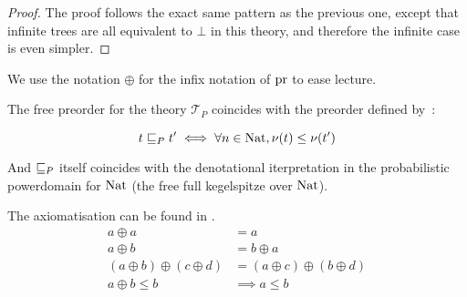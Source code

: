 \begin{proof}
    The proof follows the exact same pattern as the previous one,
    except that infinite trees are all equivalent to $\bot$ 
    in this theory, and therefore the infinite case is even 
    simpler.
\end{proof}


\begin{alemma}
    We use the notation $\oplus$ for the infix notation 
    of $\operatorname{pr}$ to ease lecture.

    The free preorder for the theory $\mathcal{T}_P$
    coincides with the preorder defined by~:
    
    \begin{equation*}
        t \sqsubseteq_P t' \iff 
        \forall n \in \textnormal{Nat}, \nu (t) \leq \nu (t')
    \end{equation*}

    And $\sqsubseteq_P$ itself coincides with the denotational
    iterpretation in the probabilistic powerdomain for $\textnormal{Nat}$
    (the free full kegelspitze over $\textnormal{Nat}$).

    The axiomatisation can be found in \cite{heckmann1994probabilistic}.
    \begin{equation*}
        \begin{array}{rl}
            a \oplus a &= a \\
            a \oplus b &= b \oplus a \\
            (a \oplus b) \oplus (c \oplus d) &= (a \oplus c) \oplus (b \oplus d) \\
            a \oplus b \leq b &\implies a \leq b
        \end{array}
    \end{equation*}
\end{alemma}

